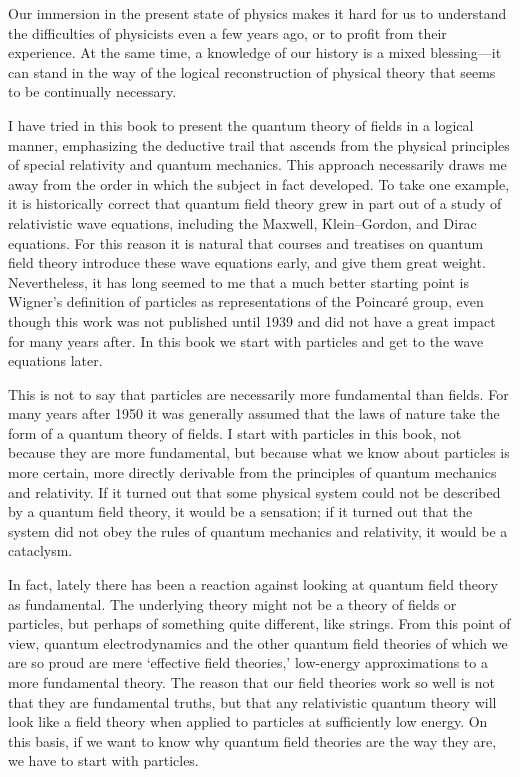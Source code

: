
Our immersion in the present state of physics makes it hard for us to
understand the difficulties of physicists even a few years ago, or to profit
from their experience. At the same time, a knowledge of our history is a
mixed blessing---it can stand in the way of the logical reconstruction of
physical theory that seems to be continually necessary.

I have tried in this book to present the quantum theory of fields in
a logical manner, emphasizing the deductive trail that ascends from the
physical principles of special relativity and quantum mechanics. This
approach necessarily draws me away from the order in which the subject
in fact developed. To take one example, it is historically correct that
quantum field theory grew in part out of a study of relativistic wave
equations, including the Maxwell, Klein--Gordon, and Dirac equations.
For this reason it is natural that courses and treatises on quantum field
theory introduce these wave equations early, and give them great weight.
Nevertheless, it has long seemed to me that a much better starting point is
Wigner's definition of particles as representations of the Poincar\'e
group, even though this work was not published until 1939 and
did not have a great impact for many years after. In this book we start
with particles and get to the wave equations later.

This is not to say that particles are necessarily more fundamental than
fields. For many years after 1950 it was generally assumed that the
laws of nature take the form of a quantum theory of fields. I start
with particles in this book, not because they are more fundamental, but
because what we know about particles is more certain, more directly
derivable from the principles of quantum mechanics and relativity. If it
turned out that some physical system could not be described by a quantum
field theory, it would be a sensation; if it turned out that the system did
not obey the rules of quantum mechanics and relativity, it would be a
cataclysm.

In fact, lately there has been a reaction against looking at quantum
field theory as fundamental. The underlying theory might not be a theory
of fields or particles, but perhaps of something quite different, like strings.
From this point of view, quantum electrodynamics and the other quantum
field theories of which we are so proud are mere `effective field theories,'
low-energy approximations to a more fundamental theory. The reason that
our field theories work so well is not that they are fundamental truths,
but that any relativistic quantum theory will look like a field theory when
applied to particles at sufficiently low energy. On this basis, if we want to
know why quantum field theories are the way they are, we have to start
with particles.

